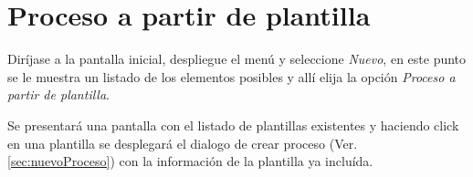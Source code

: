 \section{Proceso a partir de plantilla}
\label{sec:procesoPlantilla}

Dir\'ijase a la pantalla inicial, despliegue el men\'u \blackberry y seleccione
\emph{Nuevo}, en este punto se le muestra un listado de los elementos posibles y
all\'i elija la opci\'on \emph{Proceso a partir de plantilla}.

Se presentar\'a una pantalla con el listado de plantillas existentes y haciendo
click en una plantilla se desplegar\'a el dialogo de crear proceso (Ver.
\ref{sec:nuevoProceso}) con la informaci\'on de la plantilla ya incluída.